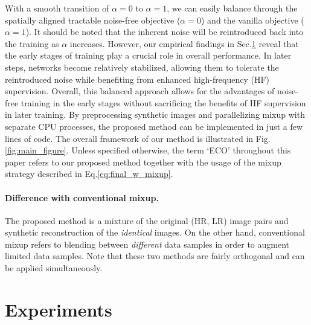 \documentclass[letterpaper]{article} %
\begin{document}
With a smooth transition of $\alpha=0$ to $\alpha=1$, we can easily balance through the spatially aligned tractable noise-free objective ($\alpha=0$) and the vanilla objective ($\alpha=1$).
%
It should be noted that the inherent noise will be reintroduced back into the training as $\alpha$ increases.
%
%
However, our empirical findings in Sec.\ref{section:experiments} reveal that the early stages of training play a crucial role in overall performance. In later steps, networks become relatively stabilized, allowing them to tolerate the reintroduced noise while benefiting from enhanced high-frequency (HF) supervision.
Overall, this balanced approach allows for the advantages of noise-free training in the early stages without sacrificing the benefits of HF supervision in later training.
%
By preprocessing synthetic images and parallelizing mixup with separate CPU processes, the proposed method can be implemented in just a few lines of code.
%
The overall framework of our method is illustrated in Fig.\ref{fig:main_figure}. Unless specified otherwise, the term `ECO' throughout this paper refers to our proposed method together with the usage of the mixup strategy described in Eq.\eqref{eq:final_w_mixup}.


\paragraph{Difference with conventional mixup.} 
The proposed method is a mixture of the original (HR, LR) image pairs and synthetic reconstruction of the \textit{identical} images. On the other hand, conventional mixup refers to blending between \textit{different} data samples in order to augment limited data samples. 
Note that these two methods are fairly orthogonal and can be applied simultaneously.




\section{Experiments}\label{section:experiments}
\end{document}
